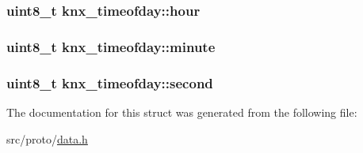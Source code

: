 \subsubsection[{\texorpdfstring{hour}{hour}}]{\setlength{\rightskip}{0pt plus 5cm}uint8\+\_\+t knx\+\_\+timeofday\+::hour}\hypertarget{structknx__timeofday_ae1f058227758a38c2cb480ad75509e89}{}\label{structknx__timeofday_ae1f058227758a38c2cb480ad75509e89}
\subsubsection[{\texorpdfstring{minute}{minute}}]{\setlength{\rightskip}{0pt plus 5cm}uint8\+\_\+t knx\+\_\+timeofday\+::minute}\hypertarget{structknx__timeofday_a5799bfbd83e86f690115d0f5c4658eab}{}\label{structknx__timeofday_a5799bfbd83e86f690115d0f5c4658eab}
\subsubsection[{\texorpdfstring{second}{second}}]{\setlength{\rightskip}{0pt plus 5cm}uint8\+\_\+t knx\+\_\+timeofday\+::second}\hypertarget{structknx__timeofday_a4c011f667b95b070e86fba92510d1590}{}\label{structknx__timeofday_a4c011f667b95b070e86fba92510d1590}


The documentation for this struct was generated from the following file\+:\begin{DoxyCompactItemize}
\item 
src/proto/\hyperlink{data_8h}{data.\+h}\end{DoxyCompactItemize}
